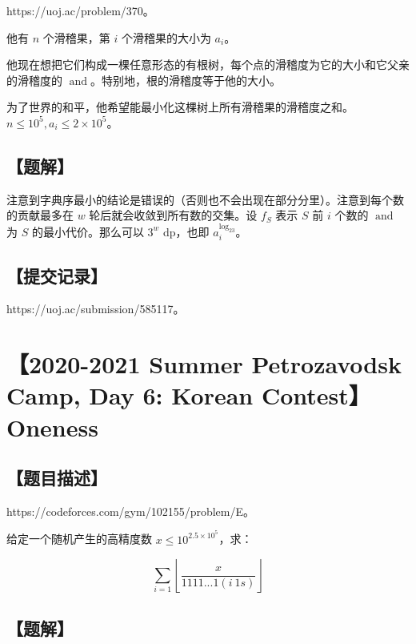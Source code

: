 \documentclass[UTF8,12pt,a4paper]{ctexart}
\begin{document}
	https://uoj.ac/problem/370。
	
	他有 $n$ 个滑稽果，第 $i$ 个滑稽果的大小为 $a_i$。
	
	他现在想把它们构成一棵任意形态的有根树，每个点的滑稽度为它的大小和它父亲的滑稽度的 $\operatorname{and}$。特别地，根的滑稽度等于他的大小。
	
	为了世界的和平，他希望能最小化这棵树上所有滑稽果的滑稽度之和。$n\le 10^5,a_i\le 2\times 10^5$。
	
	\subsection*{【题解】}
	
	注意到字典序最小的结论是错误的（否则也不会出现在部分分里）。注意到每个数的贡献最多在 $w$ 轮后就会收敛到所有数的交集。设 $f_S$ 表示 $S$ 前 $i$ 个数的 $\operatorname{and}$ 为 $S$ 的最小代价。那么可以 $3^w$ dp，也即 $a_i^{\log_23}$。
	
	\subsection*{【提交记录】}
	
	https://uoj.ac/submission/585117。
	
	
	\section*{【2020-2021 Summer Petrozavodsk Camp, Day 6: Korean Contest】Oneness}
	
	\subsection*{【题目描述】}
	
	https://codeforces.com/gym/102155/problem/E。
	
	给定一个随机产生的高精度数 $x\le 10^{2.5\times 10^5}$，求：
	
	$$\sum_{i=1}\left\lfloor\frac x{1111...1(i\ 1s)}\right\rfloor$$
	
	\subsection*{【题解】}
	
\end{document}
